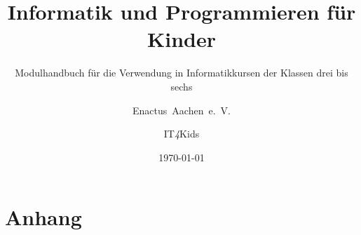 



\newcommand*{\includeimage}[1]{\texttt{[image: \#1]}}
\newcommand*{\version}{1. Vorabversion}

\titlehead{}
\subject{}
\title{Informatik und Programmieren für Kinder}
\subtitle{Modulhandbuch für die Verwendung in Informatikkursen der Klassen drei bis sechs}
\author{Enactus~Aachen~e.~V.\and IT\emph{4}Kids}
\date{\today}
\publishers{Zusammengetragen und editiert von Steffen Schneider, Lucas Mosig, Dimitri Rusin und Leonhard Hetz}
\extratitle{\centering IT\emph{4}Kids Modulhandbuch \\ \copyright~2015~Enactus~Aachen~e.~V.\\\version}
\uppertitleback{\version~vom \today}
\lowertitleback{Dieses Material steht unter der Creative-Commons-Lizenz Namensnennung-Nicht kommerziell 4.0 International. Um eine Kopie dieser Lizenz zu sehen, besuchen Sie http://creativecommons.org/licenses/by-nc/4.0/.
\texttt{[image: img/by-nc-eu.eps]}}
\dedication{''I think everyone in this country should learn to program a computer. Everyone should learn a computer language because it teaches you how to think. I think of computer science as a liberal art.``\textit{-~Steve~Jobs}}
\maketitle


\frontmatter


\tableofcontents

\mainmatter







\appendix

\backmatter
\chapter{Anhang}

%



